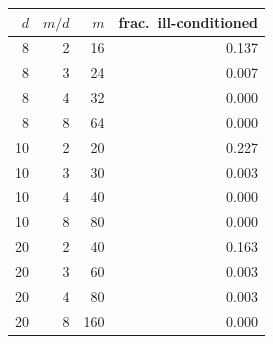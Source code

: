 \begin{tabular}{rrrr}
\toprule
$d$ & $m/d$ & $m$ & frac.\ ill-conditioned\\
\midrule
8 & 2 & 16 & 0.137\\
8 & 3 & 24 & 0.007\\
8 & 4 & 32 & 0.000\\
8 & 8 & 64 & 0.000\\
10 & 2 & 20 & 0.227\\
10 & 3 & 30 & 0.003\\
10 & 4 & 40 & 0.000\\
10 & 8 & 80 & 0.000\\
20 & 2 & 40 & 0.163\\
20 & 3 & 60 & 0.003\\
20 & 4 & 80 & 0.003\\
20 & 8 & 160 & 0.000\\
\bottomrule
\end{tabular}
